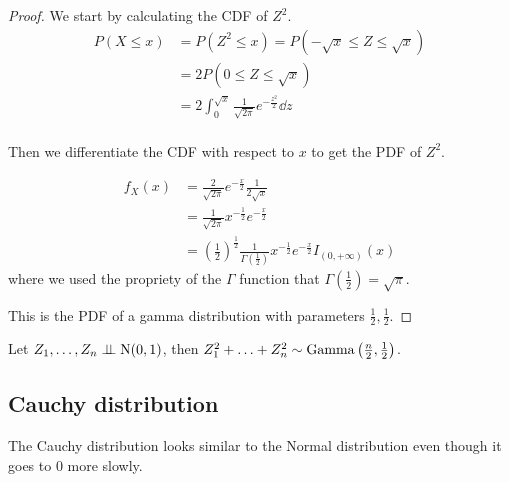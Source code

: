 \documentclass[14pt]{extarticle}
\newcommand{\Normal}{{\operatorfont N}}
\newcommand{\GammaD}{{\operatorfont Gamma}}
\begin{document}
\begin{proof}
    We start by calculating the CDF of $Z^2$.
    \begin{align}
        P(X \leq x) & = P(Z^2 \leq x) = P(-\sqrt{x} \leq Z \leq \sqrt{x})                  \\
                    & = 2P(0 \leq Z \leq \sqrt{x})                                         \\
                    & = 2\int_0^{\sqrt{x}} \frac{1}{\sqrt{2\pi}} e^{-\frac{z^2}{2}} \dd{z} \\
    \end{align}

    Then we differentiate the CDF with respect to $x$ to get the PDF of $Z^2$.

    \begin{align}
        f_X(x) & = \frac{2}{\sqrt{2\pi}} e^{-\frac{x}{2}} \frac{1}{2\sqrt{x}}                                                                          \\
               & = \frac{1}{\sqrt{2\pi}} x^{-\frac{1}{2}} e^{-\frac{x}{2}}                                                                             \\
               & = \left(\frac{1}{2}\right)^\frac{1}{2} \frac{1}{\Gamma\left(\frac{1}{2}\right)} x^{-\frac{1}{2}} e^{-\frac{x}{2}} I_{(0, +\infty)}(x)
    \end{align}
    where we used the propriety of the $\Gamma$ function that $\Gamma\left(\frac{1}{2}\right) = \sqrt{\pi}$.

    This is the PDF of a gamma distribution with parameters $\frac{1}{2}, \frac{1}{2}$.
\end{proof}

\begin{lemma}
    Let $Z_1, \ldots, Z_n \indep \Normal(0, 1)$, then $Z_1^2 + \ldots + Z_n^2 \sim \GammaD\left(\frac{n}{2}, \frac{1}{2}\right)$.
\end{lemma}

\subsection{Cauchy distribution}

The Cauchy distribution looks similar to the Normal distribution even though it goes to $0$ more slowly.
\end{document}
